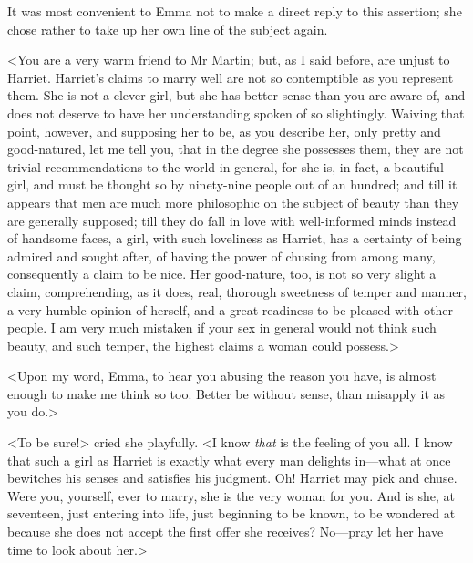 It was most convenient to Emma not to make a direct reply to this assertion; she chose rather to take up her own line of the subject again.

<You are a very warm friend to Mr Martin; but, as I said before, are unjust to Harriet. Harriet's claims to marry well are not so contemptible as you represent them. She is not a clever girl, but she has better sense than you are aware of, and does not deserve to have her understanding spoken of so slightingly. Waiving that point, however, and supposing her to be, as you describe her, only pretty and good-natured, let me tell you, that in the degree she possesses them, they are not trivial recommendations to the world in general, for she is, in fact, a beautiful girl, and must be thought so by ninety-nine people out of an hundred; and till it appears that men are much more philosophic on the subject of beauty than they are generally supposed; till they do fall in love with well-informed minds instead of handsome faces, a girl, with such loveliness as Harriet, has a certainty of being admired and sought after, of having the power of chusing from among many, consequently a claim to be nice. Her good-nature, too, is not so very slight a claim, comprehending, as it does, real, thorough sweetness of temper and manner, a very humble opinion of herself, and a great readiness to be pleased with other people. I am very much mistaken if your sex in general would not think such beauty, and such temper, the highest claims a woman could possess.>

<Upon my word, Emma, to hear you abusing the reason you have, is almost enough to make me think so too. Better be without sense, than misapply it as you do.>

<To be sure!> cried she playfully. <I know \textit{that} is the feeling of you all. I know that such a girl as Harriet is exactly what every man delights in—what at once bewitches his senses and satisfies his judgment. Oh! Harriet may pick and chuse. Were you, yourself, ever to marry, she is the very woman for you. And is she, at seventeen, just entering into life, just beginning to be known, to be wondered at because she does not accept the first offer she receives? No—pray let her have time to look about her.>

